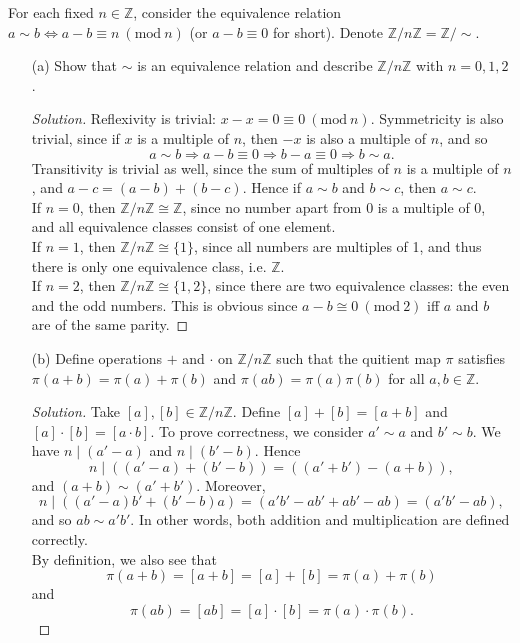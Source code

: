 \begin{problem}
    For each fixed $n \in \mathbb{Z}$, consider the equivalence relation $a \sim b \Longleftrightarrow a-b \equiv n\ (\mathrm{mod}\ n)$ (or $a-b \equiv 0$ for short). Denote $\mathbb{Z}/n \mathbb{Z} = \mathbb{Z}/\sim$.
    \begin{enumerate}
        \item[(a)] Show that $\sim$ is an equivalence relation and describe $\mathbb{Z}/n \mathbb{Z}$ with $n = 0,1,2$.
            \begin{proof}[Solution]
                Reflexivity is trivial: $x - x = 0 \equiv 0\ (\mathrm{mod}\ n)$. Symmetricity is also trivial, since if $x$ is a multiple of $n$, then $-x$ is also a multiple of $n$, and so
                \[
                    a \sim b \Longrightarrow a - b \equiv 0 \Longrightarrow b - a \equiv 0 \Longrightarrow b \sim a.
                \]
                Transitivity is trivial as well, since the sum of multiples of $n$ is a multiple of $n$, and $a - c = (a - b) + (b - c)$. Hence if $a \sim b$ and $b \sim c$, then $a \sim c$.\\
                If $n = 0$, then $\mathbb{Z}/n \mathbb{Z} \cong \mathbb{Z}$, since no number apart from 0 is a multiple of 0, and all equivalence classes consist of one element.\\
                If $n = 1$, then $\mathbb{Z}/n \mathbb{Z} \cong \{1\}$, since all numbers are multiples of 1, and thus there is only one equivalence class, i.e. $\mathbb{Z}$.\\
                If $n = 2$, then $\mathbb{Z}/n \mathbb{Z} \cong \{1,2\}$, since there are two equivalence classes: the even and the odd numbers. This is obvious since $a - b \cong 0\ (\mathrm{mod}\ 2)$ iff $a$ and $b$ are of the same parity.
            \end{proof}

        \item[(b)] Define operations $+$ and $\cdot$ on $\mathbb{Z}/n \mathbb{Z}$ such that the quitient map $\pi$ satisfies $\pi(a+b) = \pi(a) + \pi(b)$ and $\pi(ab) = \pi(a)\pi(b)$ for all $a,b \in \mathbb{Z}$.
            \begin{proof}[Solution]
                Take $[a], [b] \in \mathbb{Z}/n\mathbb{Z}$. Define $[a] + [b] = [a + b]$ and $[a] \cdot [b] = [a \cdot b]$. To prove correctness, we consider $a' \sim a$ and $b' \sim b$. We have $n \mid (a' - a)$ and $n \mid (b' - b)$. Hence
                \[
                    n \mid ((a' - a) + (b' - b)) = ((a' + b') - (a + b)),
                \]
                and $(a + b) \sim (a' + b')$. Moreover,
                \[
                    n \mid ((a' - a)b' + (b' - b)a) = (a'b' - ab' + ab' - ab) = (a'b' - ab),
                \]
                and so $ab \sim a'b'$. In other words, both addition and multiplication are defined correctly.\\
                By definition, we also see that $$\pi(a+b) = [a+b] = [a] + [b] = \pi(a) + \pi(b)$$ and $$\pi(ab) = [ab] = [a] \cdot [b] = \pi(a) \cdot \pi(b).$$
            \end{proof}
    \end{enumerate}
\end{problem}

